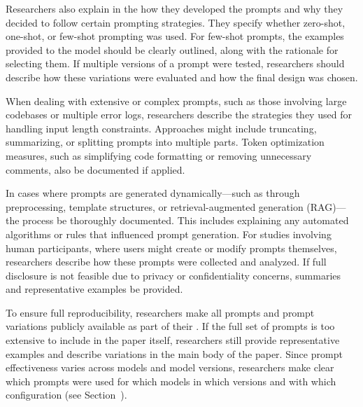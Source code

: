 Researchers \must also explain in the \paper how they developed the prompts and why they decided to follow certain prompting strategies.
They \must specify whether zero-shot, one-shot, or few-shot prompting was used. For few-shot prompts, the examples provided to the model should be clearly outlined, along with the rationale for selecting them.
If multiple versions of a prompt were tested, researchers should describe how these variations were evaluated and how the final design was chosen.

When dealing with extensive or complex prompts, such as those involving large codebases or multiple error logs, researchers \must describe the strategies they used for handling input length constraints.
Approaches might include truncating, summarizing, or splitting prompts into multiple parts.
Token optimization measures, such as simplifying code formatting or removing unnecessary comments, \must also be documented if applied.

In cases where prompts are generated dynamically—such as through preprocessing, template structures, or retrieval-augmented generation (RAG)—the process \must be thoroughly documented.
This includes explaining any automated algorithms or rules that influenced prompt generation.
For studies involving human participants, where users might create or modify prompts themselves, researchers \must describe how these prompts were collected and analyzed.
If full disclosure is not feasible due to privacy or confidentiality concerns, summaries and representative examples \should be provided.

To ensure full reproducibility, researchers \must make all prompts and prompt variations publicly available as part of their \supplementarymaterial.
If the full set of prompts is too extensive to include in the paper itself, researchers \should still provide representative examples and describe variations in the main body of the paper.
Since prompt effectiveness varies across models and model versions, researchers \must make clear which prompts were used for which models in which versions and with which configuration (see Section~\modelversion).

